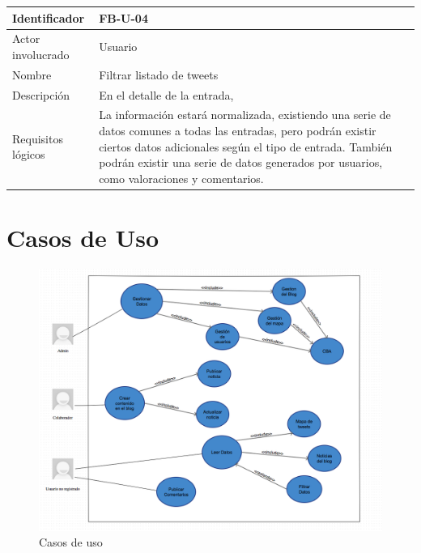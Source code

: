 \begin{table}[h!]
\centering
\begin{tabular}{|p{3cm}|p{10cm}|}
\hline
Identificador & FB-U-04 \\ \hline
Actor involucrado & Usuario \\ \hline
Nombre & Filtrar listado de tweets\\ \hline
Descripción & En el detalle de la entrada,  \\ \hline
Requisitos lógicos & La información estará normalizada, existiendo una serie de datos comunes a todas las entradas, pero podrán existir ciertos datos adicionales según el tipo de entrada. También podrán existir una serie de datos generados por usuarios, como valoraciones y comentarios. \\ \hline
\end{tabular}
\end{table}


\section{Casos de Uso}

\begin{landscape}
\begin{figure}
\begin{center}
\includegraphics[width=16cm]{imagenes/casos-de-uso.png}
\caption{Casos de uso}
\label{casos_uso}
\end{center}
\end{figure}
\end{landscape}

